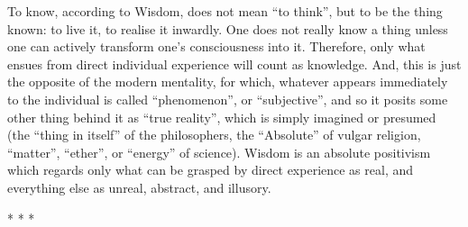 \begin{quotex}
To know, according to Wisdom, does not mean ``to think'', but to be the thing known: to live it, to realise it inwardly. One does not really know a thing unless one can actively transform one's consciousness into it. Therefore, only what ensues from direct individual experience will count as knowledge. And, this is just the opposite of the modern mentality, for which, whatever appears immediately to the individual is called ``phenomenon'', or ``subjective'', and so it posits some other thing behind it as ``true reality'', which is simply imagined or presumed (the ``thing in itself'' of the philosophers, the ``Absolute'' of vulgar religion, ``matter'', ``ether'', or ``energy'' of science). Wisdom is an absolute positivism which regards only what can be grasped by direct experience as real, and everything else as unreal, abstract, and illusory.


\end{quotex}




\begin{center}* * *\end{center}

